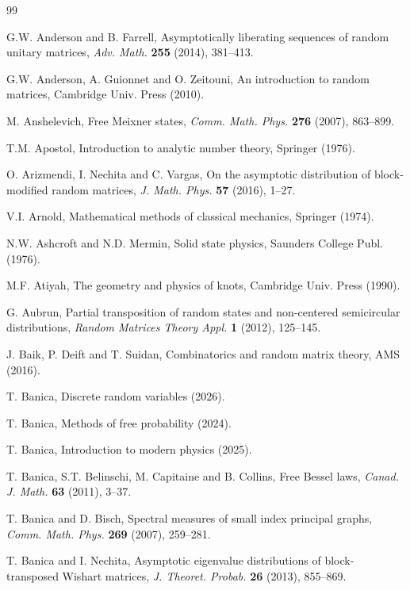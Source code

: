 \documentclass[12pt]{amsbook}
\begin{document}
\begin{thebibliography}{99}

\baselineskip=14.3pt

G.W. Anderson and B. Farrell, Asymptotically liberating sequences of random unitary matrices, {\em Adv. Math.} {\bf 255} (2014), 381--413.

G.W. Anderson, A. Guionnet and O. Zeitouni, An introduction to random matrices, Cambridge Univ. Press (2010).

M. Anshelevich, Free Meixner states, {\em Comm. Math. Phys.} {\bf 276} (2007), 863--899.

T.M. Apostol, Introduction to analytic number theory, Springer (1976).

O. Arizmendi, I. Nechita and C. Vargas, On the asymptotic distribution of block-modified random matrices, {\em J. Math. Phys.} {\bf 57} (2016), 1--27.

V.I. Arnold, Mathematical methods of classical mechanics, Springer (1974).

N.W. Ashcroft and N.D. Mermin, Solid state physics, Saunders College Publ. (1976).

M.F. Atiyah, The geometry and physics of knots, Cambridge Univ. Press (1990).

G. Aubrun, Partial transposition of random states and non-centered semicircular distributions, {\em Random Matrices Theory Appl.} {\bf 1} (2012), 125--145.

J. Baik, P. Deift and T. Suidan, Combinatorics and random matrix theory, AMS (2016).

T. Banica, Discrete random variables (2026).

T. Banica, Methods of free probability (2024).

T. Banica, Introduction to modern physics (2025).

T. Banica, S.T. Belinschi, M. Capitaine and B. Collins, Free Bessel laws, {\em Canad. J. Math.} {\bf 63} (2011), 3--37.

T. Banica and D. Bisch, Spectral measures of small index principal graphs, {\em Comm. Math. Phys.} {\bf 269} (2007), 259--281.

T. Banica and I. Nechita, Asymptotic eigenvalue distributions of block-transposed Wishart matrices, {\em J. Theoret. Probab.} {\bf 26} (2013), 855--869.


\end{thebibliography}
\end{document}
